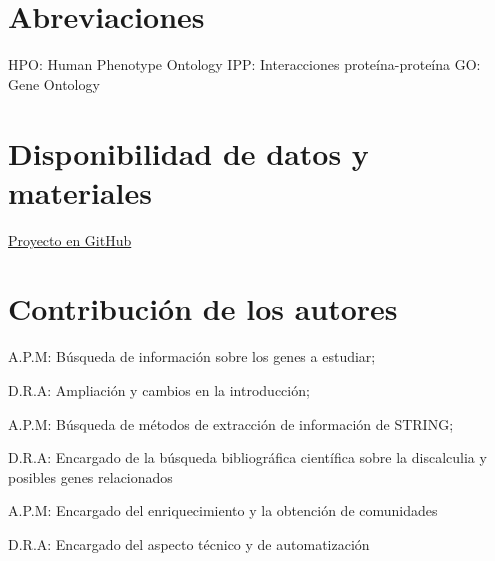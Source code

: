 \documentclass{bmcart}
\begin{document}
	\begin{backmatter}
	
		\section*{Abreviaciones}%
			HPO: Human Phenotype Ontology
			\hfill
			IPP: Interacciones proteína-proteína
			\hfill
			GO: Gene Ontology

		
		\section*{Disponibilidad de datos y materiales}%
			\href{https://github.com/Archerd6/Projecto_Biologia_de_Sistemas}{Proyecto en GitHub}
		
		\section*{Contribución de los autores}
		    
		    A.P.M:  Búsqueda de información sobre los genes a estudiar;
			\hfill
		    
		    D.R.A: Ampliación y cambios en la introducción;
		    \hfill
			
			A.P.M:  Búsqueda de métodos de extracción de información de STRING;
			\hfill
			
			D.R.A: Encargado de la búsqueda bibliográfica científica sobre la discalculia y posibles genes relacionados
			
			\hfill
			
			A.P.M: Encargado del enriquecimiento y la obtención de comunidades
			
			\hfill
			
			D.R.A: Encargado del aspecto técnico y de automatización
		
		
		
	
	\end{backmatter}
\end{document}

